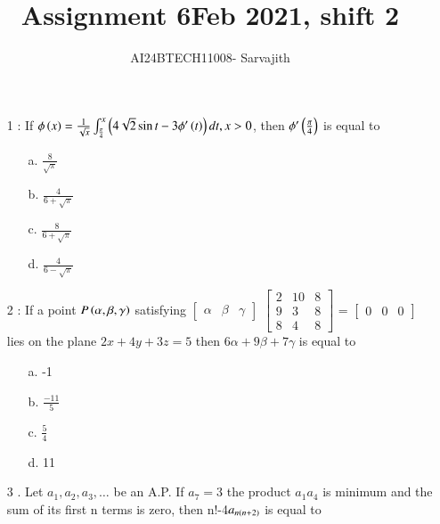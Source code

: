 \documentclass[journal]{IEEEtran}
\begin{document}

\vspace{3cm}


\author{AI24BTECH11008- Sarvajith
}
\title{Assignment 6}
{\let\newpage\relax\maketitle}
\title{Feb 2021, shift 2}
\renewcommand{\thefigure}{\theenumi}
\renewcommand{\thetable}{\theenumi}
\setlength{\intextsep}{10pt} %
\renewcommand{\thetable}{\theenumi}
\begin{enumerate}
\item [1]: If $\phi \left(x\right) = \frac{1}{\sqrt{x}}\int _{\frac{\pi}{4}} ^x \left(4\sqrt{2}\sin t - 3\phi '\left(t\right)\right)dt, x>0$, then $\phi '\left(\frac{\pi}{4}\right)$ is equal to
\begin{enumerate}
    \item [a.] $\frac{8}{\sqrt{\pi}}$
    \item [b.]  $\frac{4}{6+\sqrt{\pi}}$
    \item [c.]  $\frac{8}{6+\sqrt{\pi}}$
    \item [d.]  $\frac{4}{6-\sqrt{\pi}}$
\end{enumerate}
\item[2]: If a point $P\left(\alpha, \beta, \gamma\right)$ satisfying $\begin{bmatrix}\alpha & \beta & \gamma \end{bmatrix}$ $\begin{bmatrix}
    2 & 10 & 8\\ 9&3&8\\8&4&8
\end{bmatrix} $ = $\begin{bmatrix}
    0&0&0
\end{bmatrix}$ lies on the plane $2x+4y+3z=5$ then $6\alpha + 9\beta + 7\gamma$ is equal to
\begin{enumerate}
    \item [a.] -1
    \item [b.] $\frac{-11}{5}$
    \item [c.] $\frac{5}{4}$
    \item [d.] 11
\end{enumerate}
\item[3]. Let $a_1, a_2, a_3, \ldots$ be an A.P. If $a_7=3$ the product $a_1a_4$ is minimum and the sum of its first n terms is zero, then n!-4$a_{n\left(n+2\right)}$ is equal to  

\end{enumerate}
\end{document}
